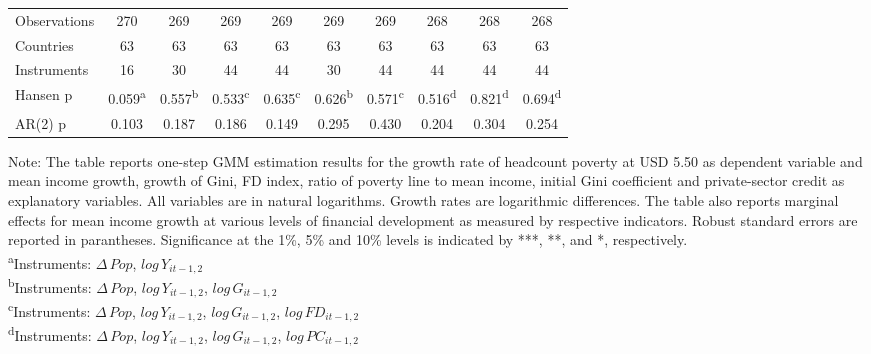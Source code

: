 \documentclass[12pt, a4paper]{article}
\begin{document}
\begin{appendices}
\begin{table}[htbp]
\begin{threeparttable}
{\begin{tabular}{l*{9}{c}}
				\hline
				Observations        &         270         &         269         &         269         &         269         &         269         &         269         &         268         &         268         &         268         \\
				Countries           &          63         &          63         &          63         &          63         &          63         &          63         &          63         &          63         &          63         \\
				Instruments         &          16         &          30         &          44         &          44         &          30         &          44         &          44         &          44         &          44         \\
				Hansen p         &       0.059\textsuperscript{a}         &       0.557\textsuperscript{b}         &       0.533\textsuperscript{c}         &       0.635\textsuperscript{c}         &       0.626\textsuperscript{b}         &       0.571\textsuperscript{c}         &       0.516\textsuperscript{d}         &       0.821\textsuperscript{d}         &       0.694\textsuperscript{d}         \\
				AR(2) p              &       0.103         &       0.187         &       0.186         &       0.149         &       0.295         &       0.430         &       0.204         &       0.304         &       0.254         \\
				\hline\hline
			\end{tabular}
		}
		\begin{tablenotes}
			\item \scriptsize{Note: The table reports one-step GMM estimation results for the growth rate of headcount poverty at USD 5.50 as dependent variable and mean income growth, growth of Gini, FD index, ratio of poverty line to mean income, initial Gini coefficient and private-sector credit as explanatory variables. All variables are in natural logarithms. Growth rates are logarithmic differences. The table also reports marginal effects for mean income growth at various levels of financial development as measured by respective indicators. Robust standard errors are reported in parantheses. Significance at the 1\%, 5\% and 10\% levels is indicated by ***, **, and *, respectively.\\
				\textsuperscript{a}Instruments: $\Delta \, Pop$, $log \, Y_{it-1,2}$}\\
			\textsuperscript{b}Instruments: $\Delta \, Pop$, $log \, Y_{it-1,2}$, $log \, G_{it-1,2}$\\
			\textsuperscript{c}Instruments: $\Delta \, Pop$, $log \, Y_{it-1,2}$, $log \, G_{it-1,2}$, $log \, FD_{it-1,2}$\\
			\textsuperscript{d}Instruments: $\Delta \, Pop$, $log \, Y_{it-1,2}$, $log \, G_{it-1,2}$, $log \, PC_{it-1,2}$\\
			

\end{tablenotes}
\end{threeparttable}
\end{table}
\end{appendices}
\end{document}
